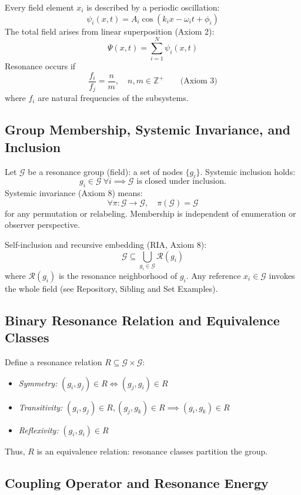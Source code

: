 \documentclass[12pt]{article}
\begin{document}
	Every field element $x_i$ is described by a periodic oscillation:
	\[
	\psi_i(x, t) = A_i \cos(k_i x - \omega_i t + \phi_i)
	\]
	The total field arises from linear superposition (Axiom 2):
	\[
	\Psi(x, t) = \sum_{i=1}^N \psi_i(x, t)
	\]
	Resonance occurs if
	\[
	\frac{f_i}{f_j} = \frac{n}{m}, \quad n, m \in \mathbb{Z}^+ \qquad \text{(Axiom 3)}
	\]
	where $f_i$ are natural frequencies of the subsystems.
	
	\subsection{Group Membership, Systemic Invariance, and Inclusion}
	
	Let $\mathcal{G}$ be a resonance group (field): a set of nodes $\{g_i\}$. Systemic inclusion holds:
	\[
	g_i \in \mathcal{G}\ \forall i \implies \mathcal{G} \text{ is closed under inclusion.}
	\]
	Systemic invariance (Axiom 8) means:
	\[
	\forall \pi : \mathcal{G} \to \mathcal{G},\quad \pi(\mathcal{G}) = \mathcal{G}
	\]
	for any permutation or relabeling. Membership is independent of enumeration or observer perspective.
	
	Self-inclusion and recursive embedding (RIA, Axiom 8):
	\[
	\mathcal{G} \subseteq \bigcup_{g_i \in \mathcal{G}} \mathcal{R}(g_i)
	\]
	where $\mathcal{R}(g_i)$ is the resonance neighborhood of $g_i$. Any reference $x_i \in \mathcal{G}$ invokes the whole field (see Repository, Sibling and Set Examples).
	
	\subsection{Binary Resonance Relation and Equivalence Classes}
	
	Define a resonance relation $R \subseteq \mathcal{G} \times \mathcal{G}$:
	\begin{itemize}
		\item \textit{Symmetry:} $(g_i, g_j) \in R \iff (g_j, g_i) \in R$
		\item \textit{Transitivity:} $(g_i, g_j) \in R, (g_j, g_k) \in R \implies (g_i, g_k) \in R$
		\item \textit{Reflexivity:} $(g_i, g_i) \in R$
	\end{itemize}
	Thus, $R$ is an equivalence relation: resonance classes partition the group.
	
	\subsection{Coupling Operator and Resonance Energy}
	
\end{document}
